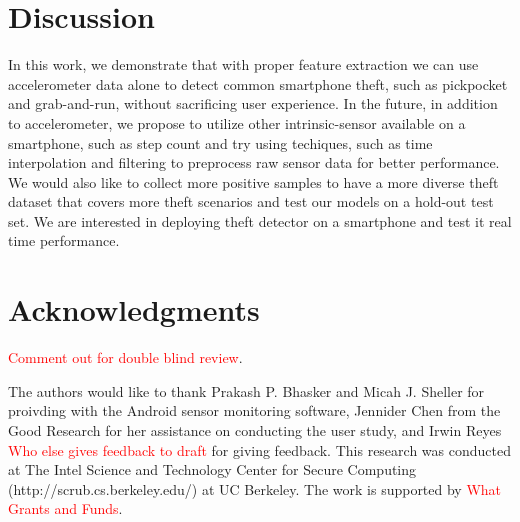 \documentclass{soups}
\begin{document}
\section{Discussion}
In this work, we demonstrate that with proper feature extraction we can use accelerometer data alone to detect common smartphone theft, such as pickpocket and grab-and-run, without sacrificing user experience. 
In the future, in addition to accelerometer, we propose to utilize other intrinsic-sensor available on a smartphone, such as step count and try using techiques, such as time interpolation and filtering to preprocess raw sensor data for better performance. 
We would also like to collect more positive samples to have a more diverse theft dataset that covers more theft scenarios and test our models on a hold-out test set. 
We are interested in deploying theft detector on a smartphone and test it real time performance.




\section{Acknowledgments}
\textcolor{red}{Comment out for double blind review}. 

The authors would like to thank Prakash P. Bhasker and Micah J. Sheller for proivding with the Android sensor monitoring software, Jennider Chen from the Good Research for her assistance on conducting the user study, and Irwin Reyes \textcolor{red}{Who else gives feedback to draft} for giving feedback. 
This research was conducted at The Intel Science and Technology Center for Secure Computing (http://scrub.cs.berkeley.edu/) at UC Berkeley. 
The work is supported by \textcolor{red}{What Grants and Funds}. 





%
\end{document}

